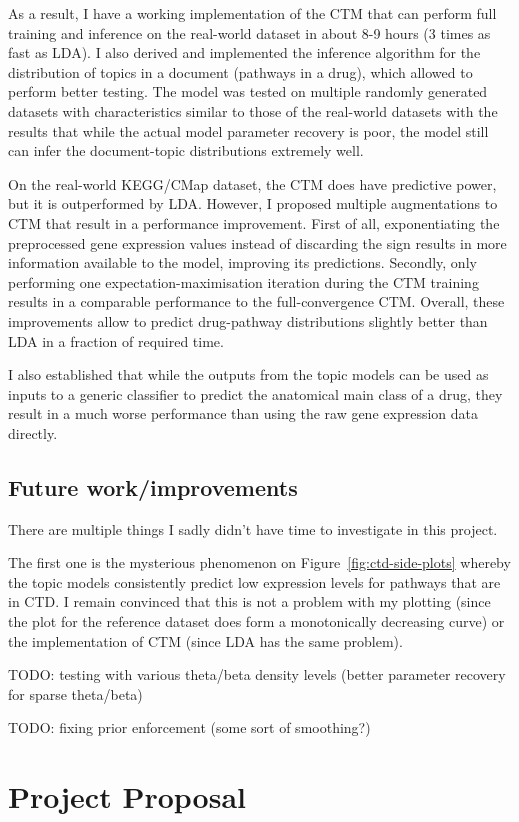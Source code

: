 \documentclass[12pt,a4paper,twoside,openright]{report}
\begin{document}
As a result, I have a working implementation of the CTM that can perform full training and inference on the real-world dataset in about 8-9 hours (3 times as fast as LDA). I also derived and implemented the inference algorithm for the distribution of topics in a document (pathways in a drug), which allowed to perform better testing. The model was tested on multiple randomly generated datasets with characteristics similar to those of the real-world datasets with the results that while the actual model parameter recovery is poor, the model still can infer the document-topic distributions extremely well.

On the real-world KEGG/CMap dataset, the CTM does have predictive power, but it is outperformed by LDA. However, I proposed multiple augmentations to CTM that result in a performance improvement. First of all, exponentiating the preprocessed gene expression values instead of discarding the sign results in more information available to the model, improving its predictions. Secondly, only performing one expectation-maximisation iteration during the CTM training results in a comparable performance to the full-convergence CTM. Overall, these improvements allow to predict drug-pathway distributions slightly better than LDA in a fraction of required time.

I also established that while the outputs from the topic models can be used as inputs to a generic classifier to predict the anatomical main class of a drug, they result in a much worse performance than using the raw gene expression data directly.

\section{Future work/improvements}

There are multiple things I sadly didn't have time to investigate in this project.

The first one is the mysterious phenomenon on Figure~\ref{fig:ctd-side-plots} whereby the topic models consistently predict low expression levels for pathways that are in CTD. I remain convinced that this is not a problem with my plotting (since the plot for the reference dataset does form a monotonically decreasing curve) or the implementation of CTM (since LDA has the same problem).

TODO: testing with various theta/beta density levels (better parameter recovery for sparse theta/beta)

TODO: fixing prior enforcement (some sort of smoothing?)




\appendix

\chapter{Project Proposal}


\end{document}
